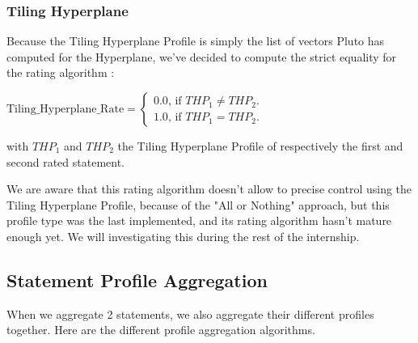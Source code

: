 \documentclass[paper=a4, fontsize=11.5pt]{scrartcl}
\numberwithin{equation}{section}        %
\numberwithin{figure}{section}          %
\numberwithin{table}{section}               %
\begin{document}
        \subsubsection{Tiling Hyperplane}
            Because the Tiling Hyperplane Profile is simply the list of vectors
            Pluto has computed for the Hyperplane, we've decided to compute the strict
            equality for the rating algorithm : 
            \begin{center}
                $ \mathrm{Tiling\_Hyperplane\_Rate} =  \left \{
                    \begin{array}{c}
                        0.0\text{, if } \mathit{THP}_1 \neq \mathit{THP}_2. \\
                        1.0\text{, if } \mathit{THP}_1 = \mathit{THP}_2.
                    \end{array} \right.$
            \end{center}
            with $\mathit{THP}_1$ and $\mathit{THP}_2$ the Tiling Hyperplane Profile of 
            respectively the first and second rated statement.

            We are aware that this rating algorithm doesn't allow to precise control using the
            Tiling Hyperplane Profile, because of the "All or Nothing" approach,
            but this profile type was the last implemented, and its rating
            algorithm hasn't mature enough yet. We will investigating this during the rest
            of the internship.

    \subsection{Statement Profile Aggregation}
        When we aggregate 2 statements, we also aggregate their different profiles together.
        Here are the different profile aggregation algorithms.
\end{document}

